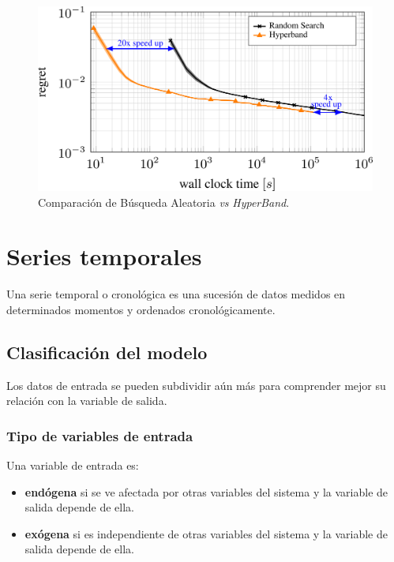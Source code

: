 \documentclass[a4paper,12pt]{article}
\begin{document}
\begin{figure}[H]
	\begin{center}
	\includegraphics[width=1\textwidth]{comparison_rs_hb.png}
  	\caption{Comparación de Búsqueda Aleatoria \textit{vs} \textit{HyperBand}.}
  	\label{fig:rs_vs_hb}
  	\end{center}
\end{figure}

\section{Series temporales}

Una serie temporal o cronológica es una sucesión de datos medidos en determinados momentos y ordenados cronológicamente. \citep{Agrawal2019Mar}

\subsection{Clasificación del modelo}

Los datos de entrada se pueden subdividir aún más para comprender mejor su relación con la variable de salida.

\subsubsection{Tipo de variables de entrada}

Una variable de entrada es:
\begin{itemize}
	\item \textbf{endógena} si se ve afectada por otras variables del sistema y la variable de salida depende de ella.
	\item \textbf{exógena} si es independiente de otras variables del sistema y la variable de salida depende de ella.
\end{itemize}
\end{document}
